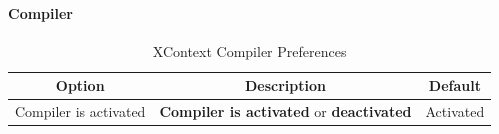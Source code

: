 \paragraph{Compiler}
\begin{table}[!htbp]
  \centering
  \begin{tabular}{|p{}|p{}|p{}|}
    \hline
    \multicolumn{1}{|c}{\textbf{Option}} & \multicolumn{1}{|c}{\textbf{Description}} &%
                                                                                       \multicolumn{1}{|c|}{\textbf{Default}} \\
    \hline
    Compiler is activated & \textbf{Compiler is activated} or \textbf{deactivated} & Activated \\
    \hline
  \end{tabular}
  \caption{XContext Compiler Preferences}
  \label{tab:xcontext-compiler-preference}
\end{table}


